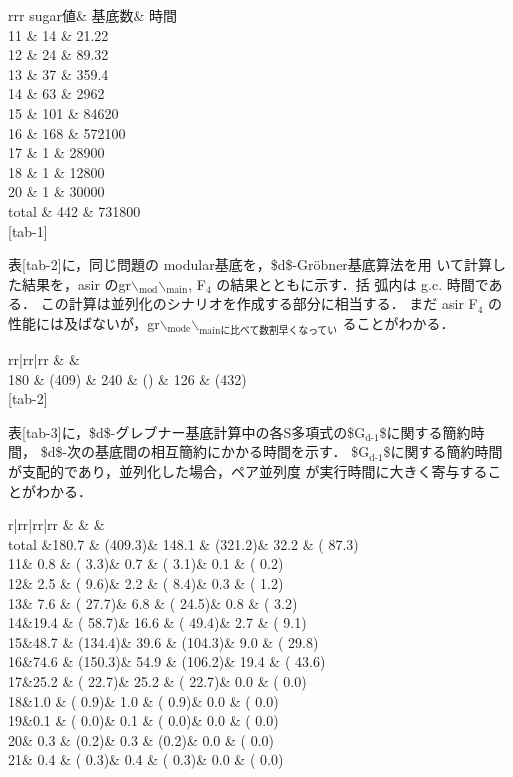 \documentclass[a4j]{jarticle}
\begin{document}
{{rrr sugar値\& 基底数\& 時間\\
11 \& 14 \& 21.22\\
12 \& 24 \& 89.32\\
13 \& 37 \& 359.4\\
14 \& 63 \& 2962\\
15 \& 101 \& 84620\\
16 \& 168 \& 572100\\
17 \& 1 \& 28900\\
18 \& 1 \& 12800\\
20 \& 1 \& 30000\\
total \& 442 \& 731800\\

[tab-1]

表[tab-2]に，同じ問題の modular基底を，\$d\$-Gröbner基底算法を用
いて計算した結果を，asir のgr$\backslash$\(_{\text{mod}}\)$\backslash$\(_{\text{main}}\), F\(_4\) の結果とともに示す．括
弧内は g.c. 時間である．
この計算は並列化のシナリオを作成する部分に相当する． まだ asir F\(_4\)
の性能には及ばないが，gr$\backslash$\(_{\text{mode}}\)$\backslash$\(_{\text{mainに比べて数割早くなってい}}\)
ることがわかる．

rr|rr|rr \& \&\\
180 \& (409) \& 240 \& () \& 126 \& (432)\\

[tab-2]

表[tab-3]に，\$d\$-グレブナー基底計算中の各S多項式の\$G\(_{\text{d-1}}\)\$に関する簡約時間，
\$d\$-次の基底間の相互簡約にかかる時間を示す．
\$G\(_{\text{d-1}}\)\$に関する簡約時間が支配的であり，並列化した場合，ペア並列度
が実行時間に大きく寄与することがわかる．

r|rr|rr|rr \& \& \&\\
total \&180.7 \& (409.3)\& 148.1 \& (321.2)\& 32.2 \& ( 87.3)\\
11\& 0.8 \& ( 3.3)\& 0.7 \& ( 3.1)\& 0.1 \& ( 0.2)\\
12\& 2.5 \& ( 9.6)\& 2.2 \& ( 8.4)\& 0.3 \& ( 1.2)\\
13\& 7.6 \& ( 27.7)\& 6.8 \& ( 24.5)\& 0.8 \& ( 3.2)\\
14\&19.4 \& ( 58.7)\& 16.6 \& ( 49.4)\& 2.7 \& ( 9.1)\\
15\&48.7 \& (134.4)\& 39.6 \& (104.3)\& 9.0 \& ( 29.8)\\
16\&74.6 \& (150.3)\& 54.9 \& (106.2)\& 19.4 \& ( 43.6)\\
17\&25.2 \& ( 22.7)\& 25.2 \& ( 22.7)\& 0.0 \& ( 0.0)\\
18\&1.0 \& ( 0.9)\& 1.0 \& ( 0.9)\& 0.0 \& ( 0.0)\\
19\&0.1 \& ( 0.0)\& 0.1 \& ( 0.0)\& 0.0 \& ( 0.0)\\
20\& 0.3 \& (0.2)\& 0.3 \& (0.2)\& 0.0 \& ( 0.0)\\
21\& 0.4 \& ( 0.3)\& 0.4 \& ( 0.3)\& 0.0 \& ( 0.0)\\

}}
\end{document}
